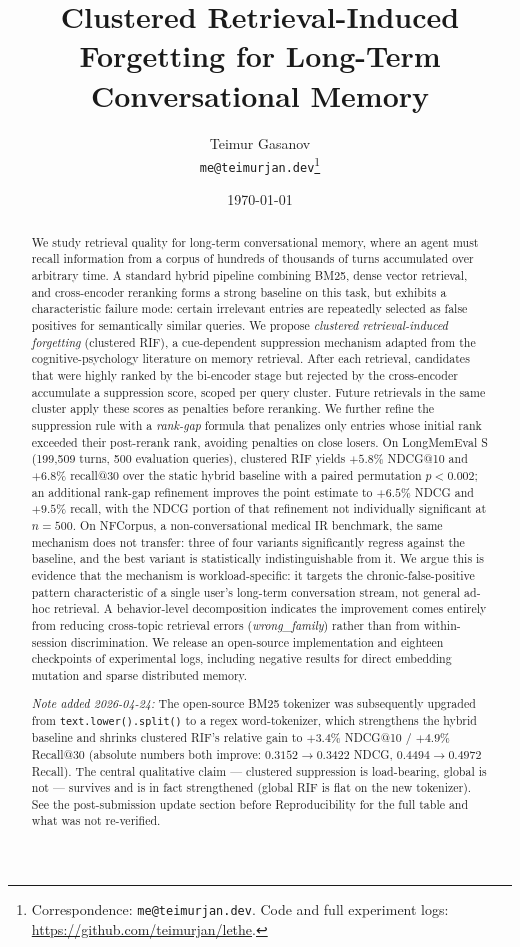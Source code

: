 \documentclass[11pt,a4paper]{article}
\title{Clustered Retrieval-Induced Forgetting for Long-Term\\Conversational Memory}
\author{%
  Teimur Gasanov\\
  \texttt{me@teimurjan.dev}\footnote{Correspondence: \texttt{me@teimurjan.dev}. Code and full experiment logs: \url{https://github.com/teimurjan/lethe}.}
}
\date{\today}
\begin{document}
\maketitle

\begin{abstract}
We study retrieval quality for long-term conversational memory, where an agent must recall information from a corpus of hundreds of thousands of turns accumulated over arbitrary time. A standard hybrid pipeline combining BM25, dense vector retrieval, and cross-encoder reranking forms a strong baseline on this task, but exhibits a characteristic failure mode: certain irrelevant entries are repeatedly selected as false positives for semantically similar queries. We propose \emph{clustered retrieval-induced forgetting} (clustered RIF), a cue-dependent suppression mechanism adapted from the cognitive-psychology literature on memory retrieval. After each retrieval, candidates that were highly ranked by the bi-encoder stage but rejected by the cross-encoder accumulate a suppression score, scoped per query cluster. Future retrievals in the same cluster apply these scores as penalties before reranking. We further refine the suppression rule with a \emph{rank-gap} formula that penalizes only entries whose initial rank exceeded their post-rerank rank, avoiding penalties on close losers. On LongMemEval S (199{,}509 turns, 500 evaluation queries), clustered RIF yields $+5.8\%$ NDCG@10 and $+6.8\%$ recall@30 over the static hybrid baseline with a paired permutation $p < 0.002$; an additional rank-gap refinement improves the point estimate to $+6.5\%$ NDCG and $+9.5\%$ recall, with the NDCG portion of that refinement not individually significant at $n=500$. On NFCorpus, a non-conversational medical IR benchmark, the same mechanism does not transfer: three of four variants significantly regress against the baseline, and the best variant is statistically indistinguishable from it. We argue this is evidence that the mechanism is workload-specific: it targets the chronic-false-positive pattern characteristic of a single user's long-term conversation stream, not general ad-hoc retrieval. A behavior-level decomposition indicates the improvement comes entirely from reducing cross-topic retrieval errors (\emph{wrong\_family}) rather than from within-session discrimination. We release an open-source implementation and eighteen checkpoints of experimental logs, including negative results for direct embedding mutation and sparse distributed memory.

\noindent\emph{Note added 2026-04-24:} The open-source BM25 tokenizer was subsequently upgraded from \texttt{text.lower().split()} to a regex word-tokenizer, which strengthens the hybrid baseline and shrinks clustered RIF's relative gain to $+3.4\%$ NDCG@10 / $+4.9\%$ Recall@30 (absolute numbers both improve: $0.3152 \to 0.3422$ NDCG, $0.4494 \to 0.4972$ Recall). The central qualitative claim — clustered suppression is load-bearing, global is not — survives and is in fact strengthened (global RIF is flat on the new tokenizer). See the post-submission update section before Reproducibility for the full table and what was not re-verified.
\end{abstract}
\end{document}
